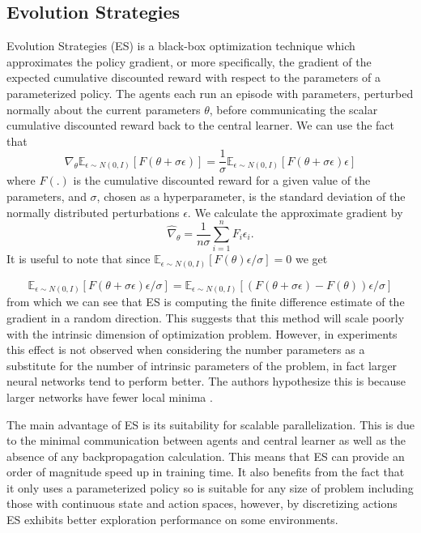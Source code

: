 \subsection{Evolution Strategies}
\label{sec:ES}
Evolution Strategies (ES) \cite{ES} is a black-box optimization technique which approximates the policy gradient, or more specifically, the gradient of the expected cumulative discounted reward with respect to the parameters of a parameterized policy.
The agents each run an episode with parameters, perturbed normally about the current parameters $\theta$, before communicating the scalar cumulative discounted reward back to the central learner.
We can use the fact that
\begin{equation*}
        \nabla_\theta \mathbb{E}_{\epsilon \sim N(0,I)}[F(\theta+\sigma \epsilon)] = \frac{1}{\sigma}\mathbb{E}_{\epsilon \sim N(0,I)}[F(\theta+\sigma \epsilon) \epsilon]
\end{equation*}
where $F(.)$ is the cumulative discounted reward for a given value of the parameters, and $\sigma$, chosen as a hyperparameter, is the standard deviation of the normally distributed perturbations $\epsilon$.
We calculate the approximate gradient by
\begin{equation}
        \hat{\nabla}_\theta = \frac{1}{n\sigma}\sum^n_{i=1} F_i \epsilon_i.
        \label{eq:grad}
\end{equation}
It is useful to note that since $\mathbb{E}_{\epsilon \sim N(0,I)}[F(\theta)\epsilon/\sigma] = 0$ we get

\begin{equation*}
    \mathbb{E}_{\epsilon \sim N(0,I)}[F(\theta+\sigma \epsilon) \epsilon/\sigma] = \mathbb{E}_{\epsilon \sim N(0,I)}[(F(\theta+\sigma \epsilon) - F(\theta))\epsilon/\sigma]
\end{equation*}
from which we can see that ES is computing the finite difference estimate of the gradient in a random direction. This suggests that this method will scale poorly with the intrinsic dimension of optimization problem. However, in experiments this effect is not observed when considering the number parameters as a substitute for the number of intrinsic parameters of the problem, in fact larger neural networks tend to perform better. The authors hypothesize this is because larger networks have fewer local minima \cite{LocalMinima}.

The main advantage of ES is its suitability for scalable parallelization. This is due to the minimal communication between agents and central learner as well as the absence of any backpropagation calculation. This means that ES can provide an order of magnitude speed up in training time. It also benefits from the fact that it only uses a parameterized policy so is suitable for any size of problem including those with continuous state and action spaces, however, by discretizing actions ES exhibits better exploration performance on some environments.

